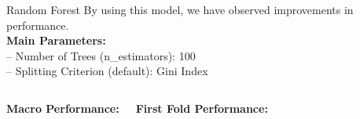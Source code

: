 \documentclass[12pt,aspectratio=169,notheorems]{beamer}
\begin{document}
\begin{frame}{Random Forest}
    \vspace{0.3cm}
        By using this model, we have observed improvements in performance.\\
        \vspace{0.2cm}
        \textbf{Main Parameters:} \\
        \vspace{0.1cm}
        -- Number of Trees (n\_estimators): 100 \\
        -- Splitting Criterion (default): Gini Index \\
        \vspace{0.5cm}
            \begin{columns}[T]
            \textbf{Macro Performance:}
            \vspace{0.2cm}
            \begin{table}[]
            \end{table}
            \textbf{First Fold Performance:}
            \vspace{0.2cm}
            \begin{table}[]
\end{table}
\end{columns}
\end{frame}
\end{document}
